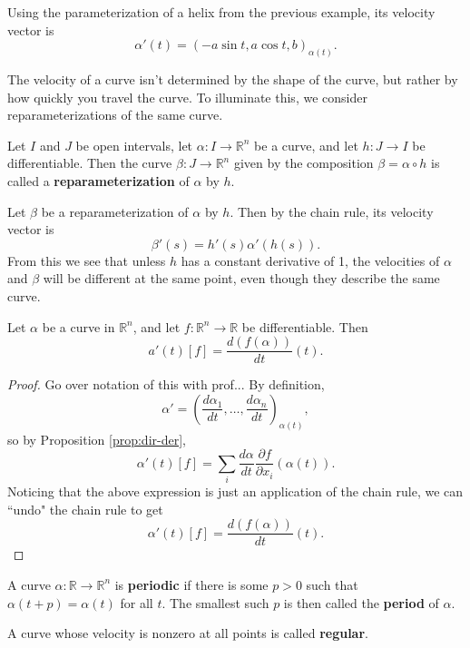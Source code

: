 \documentclass[10pt]{report}
\begin{document}
\begin{ex}
Using the parameterization of a helix from the previous example, its velocity vector is
\[
	\alpha'(t) = (-a \sin t, a \cos t, b)_{\alpha(t)}.
\]
\end{ex}

The velocity of a curve isn't determined by the shape of the curve, but rather by how quickly you travel the curve. To illuminate this, we consider reparameterizations of the same curve.

\begin{defn}
	Let $I$ and $J$ be open intervals, let $\alpha:I\to \mathbb{R}^n$ be a curve, and let $h:J\to I$ be differentiable. Then the curve $\beta:J\to \mathbb{R}^n$ given by the composition $\beta = \alpha \circ h$ is called a \textbf{reparameterization} of $\alpha$ by $h$.
\end{defn}

Let $\beta$ be a reparameterization of $\alpha$ by $h$. Then by the chain rule, its velocity vector is
\[
	\beta'(s) = h'(s) \alpha'(h(s)).
\] 
From this we see that unless $h$ has a constant derivative of 1, the velocities of $\alpha$ and $\beta$ will be different at the same point, even though they describe the same curve.

\begin{prop}
Let $\alpha$ be a curve in $\mathbb{R}^n$, and let $f:\mathbb{R}^n\to \mathbb{R}$ be differentiable. Then
\[
	a'(t)[f] = \frac{d (f(\alpha))}{d t} (t).
\] 
\end{prop}
\begin{proof}
	{\color{red}Go over notation of this with prof...}
	By definition,
	\[
		\alpha' = \left( \frac{d \alpha_1}{d t} , \dots, \frac{d \alpha_n}{d t}  \right)_{\alpha(t)},
	\] so by Proposition \ref{prop:dir-der},
	\[
		\alpha'(t)[f] = \sum_i \frac{d \alpha}{d t}  \frac{\partial f}{\partial x_i} (\alpha(t)).
	\] Noticing that the above expression is just an application of the chain rule, we can ``undo" the chain rule to get
	\[
		\alpha'(t)[f] = \frac{d (f(\alpha))}{d t} (t).
	\] 
\end{proof}

A curve $\alpha:\mathbb{R}\to \mathbb{R}^n$ is \textbf{periodic} if there is some $p>0$ such that $\alpha(t+p) = \alpha(t)$ for all $t$. The smallest such $p$ is then called the \textbf{period} of $\alpha$.

A curve whose velocity is nonzero at all points is called \textbf{regular}.


\end{document}
